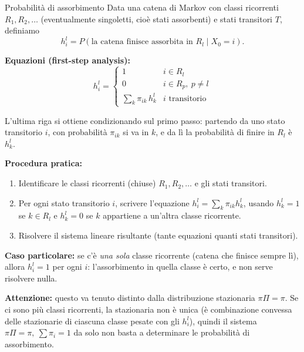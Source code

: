 \documentclass[11pt]{article}
\begin{document}
\begin{concetto}[barPurple]{Probabilità di assorbimento}
Data una catena di Markov con classi ricorrenti $R_1, R_2, \dots$ (eventualmente singoletti, cioè stati assorbenti) e stati transitori $T$, definiamo
\[ h_i^l = P(\text{la catena finisce assorbita in } R_l \mid X_0 = i). \]

\textbf{Equazioni (first-step analysis):}
\[ h_i^l = \begin{cases} 1 & i \in R_l \\ 0 & i \in R_p,\ p\neq l \\ \displaystyle\sum_k \pi_{ik}\, h_k^l & i \text{ transitorio} \end{cases} \]

L'ultima riga si ottiene condizionando sul primo passo: partendo da uno stato transitorio $i$, con probabilità $\pi_{ik}$ si va in $k$, e da lì la probabilità di finire in $R_l$ è $h_k^l$.

\textbf{Procedura pratica:}
\begin{enumerate}
\item Identificare le classi ricorrenti (chiuse) $R_1, R_2, \dots$ e gli stati transitori.
\item Per ogni stato transitorio $i$, scrivere l'equazione $h_i^l = \sum_k \pi_{ik} h_k^l$, usando $h_k^l=1$ se $k\in R_l$ e $h_k^l=0$ se $k$ appartiene a un'altra classe ricorrente.
\item Risolvere il sistema lineare risultante (tante equazioni quanti stati transitori).
\end{enumerate}

\textbf{Caso particolare:} se c'è \emph{una sola} classe ricorrente (catena che finisce sempre lì), allora $h_i^l=1$ per ogni $i$: l'assorbimento in quella classe è certo, e non serve risolvere nulla.

\textbf{Attenzione:} questo va tenuto distinto dalla distribuzione stazionaria $\pi\Pi=\pi$. Se ci sono più classi ricorrenti, la stazionaria non è unica (è combinazione convessa delle stazionarie di ciascuna classe pesate con gli $h_i^l$), quindi il sistema $\pi\Pi=\pi,\ \sum\pi_i=1$ da solo non basta a determinare le probabilità di assorbimento.
\end{concetto}
\end{document}
